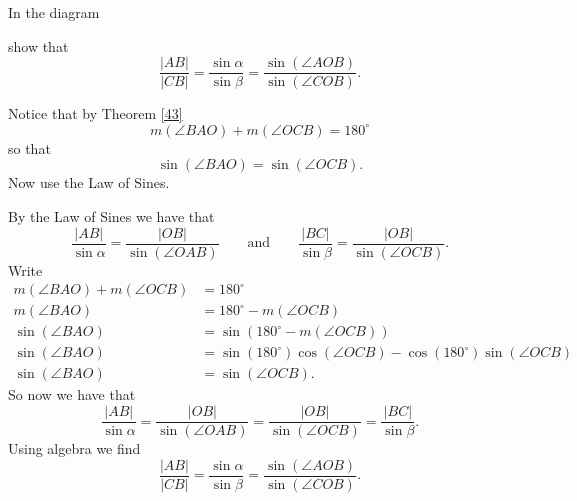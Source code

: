 \documentclass{ximera}
\begin{document}
\begin{problem}\label{46}
In the diagram
\begin{image}
\end{image}
show that%
\[
\frac{\left\vert AB\right\vert }{\left\vert CB\right\vert }=\frac
{\sin\alpha}{\sin\beta}=\frac{\sin\left(  \angle
AOB\right)  }{\sin\left(  \angle COB\right)  }.
\]


\begin{hint}
Notice that by Theorem \ref{43}
\[
m\left(  \angle BAO\right)  +m\left(\angle OCB\right)  =180^{\circ}%
\]
so that%
\[
\sin\left(  \angle BAO\right)  =\sin\left(\angle  OCB\right)  .
\]
Now use the Law of Sines.
\end{hint}
\begin{freeResponse}
By the Law of Sines we have that
\[
\frac{|AB|}{\sin\alpha} = \frac{|OB|}{\sin(\angle OAB)}\qquad\text{and}\qquad\frac{|BC|}{\sin\beta} = \frac{|OB|}{\sin(\angle OCB)}.
\]
Write 
\begin{align*}
m\left(  \angle BAO\right)  +m\left(\angle OCB\right)  &=180^{\circ}\\
m\left(  \angle BAO\right)  &=180^{\circ}-m\left(\angle OCB\right)  \\
\sin\left(\angle BAO\right)  &=\sin\left(180^{\circ}-m\left(\angle OCB\right)\right)  \\
\sin\left(\angle BAO\right)  &=\sin\left(180^{\circ}\right)\cos\left(\angle OCB\right) - \cos\left(180^{\circ}\right)\sin\left(\angle OCB\right)\\ 
\sin\left(\angle BAO\right)  &=\sin\left(\angle OCB\right).
\end{align*}
So  now we have that 
\[
\frac{|AB|}{\sin\alpha} = \frac{|OB|}{\sin(\angle OAB)}= \frac{|OB|}{\sin(\angle OCB)}=\frac{|BC|}{\sin\beta}. 
\]
Using algebra we find 
\[
\frac{\left\vert AB\right\vert }{\left\vert CB\right\vert }=\frac
{\sin\alpha}{\sin\beta}=\frac{\sin\left(  \angle
AOB\right)  }{\sin\left(  \angle COB\right)  }.
\]
\end{freeResponse}
\end{problem}
\end{document}
